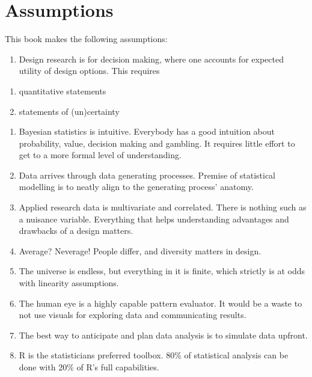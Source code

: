 \documentclass[]{svmono}
\providecommand{\tightlist}{%
  \setlength{\itemsep}{0pt}\setlength{\parskip}{0pt}}
\theoremstyle{definition}
\theoremstyle{definition}
\theoremstyle{definition}
\theoremstyle{remark}
\begin{document}
\section{Assumptions}\label{assumptions}

This book makes the following assumptions:

\begin{enumerate}
\def\labelenumi{\arabic{enumi}.}
\tightlist
\item
  Design research is for decision making, where one accounts for
  expected utility of design options. This requires
\end{enumerate}

\begin{enumerate}
\def\labelenumi{\alph{enumi}.}
\tightlist
\item
  quantitative statements
\item
  statements of (un)certainty
\end{enumerate}

\begin{enumerate}
\def\labelenumi{\arabic{enumi}.}
\setcounter{enumi}{1}
\tightlist
\item
  Bayesian statistics is intuitive. Everybody has a good intuition about
  probability, value, decision making and gambling. It requires little
  effort to get to a more formal level of understanding.
\item
  Data arrives through data generating processes. Premise of statistical
  modelling is to neatly align to the generating process' anatomy.
\item
  Applied research data is multivariate and correlated. There is nothing
  such as a nuisance variable. Everything that helps understanding
  advantages and drawbacks of a design matters.
\item
  Average? Neverage! People differ, and diversity matters in design.
\item
  The universe is endless, but everything in it is finite, which
  strictly is at odds with linearity assumptions.
\item
  The human eye is a highly capable pattern evaluator. It would be a
  waste to not use visuals for exploring data and communicating results.
\item
  The best way to anticipate and plan data analysis is to simulate data
  upfront.
\item
  R is the statisticians preferred toolbox. 80\% of statistical analysis
  can be done with 20\% of R's full capabilities.
\end{enumerate}
\end{document}
